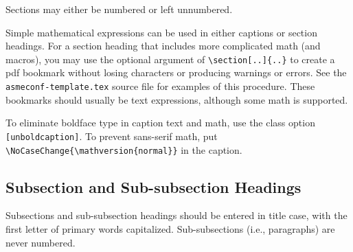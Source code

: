 \documentclass[colorlinks,upint,subscriptcorrection,varvw,hyphenate,balance,greek,russian,vietnamese,german]{asmeconf} %
\begin{document}
Sections may either be numbered or left unnumbered.

Simple mathematical expressions can be used in either captions or section headings. For a section heading that includes more complicated math (and macros), you may use the optional argument of \verb|\section[..]{..}| to create a pdf bookmark without losing characters or producing warnings or errors. See the \texttt{asmeconf-template.tex} source file for examples of this procedure. These bookmarks should usually be text expressions, although some math is supported.  

To eliminate boldface type in caption text and math, use the class option \texttt{[unboldcaption]}.  To prevent sans-serif math, put \verb|\NoCaseChange{\mathversion{normal}}| in the caption.

\subsection{Subsection and Sub-subsection Headings}

Subsections and sub-subsection headings should be entered in title case, with the first letter of primary words capitalized. Sub-subsections (i.e., paragraphs) are never numbered.




\begin{table}[t]
\caption[Table]{A simple table}\label{tab:1}
\end{table}


\end{document}
